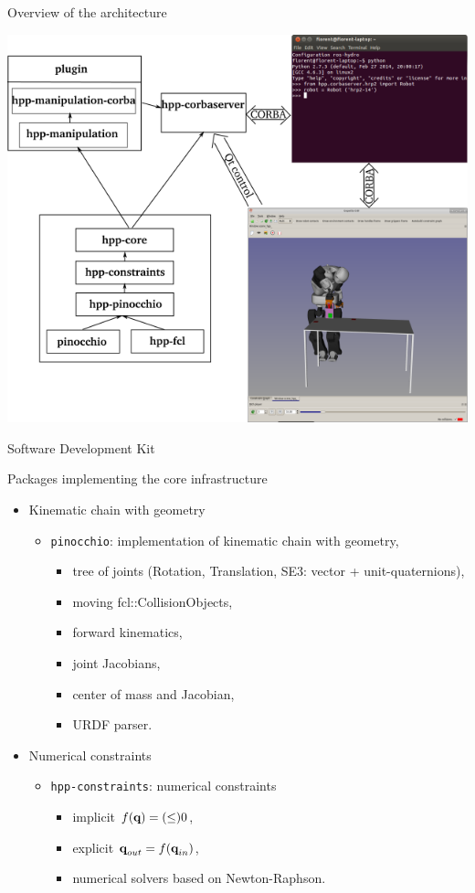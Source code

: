 %
%

\begin {frame} {Overview of the architecture}
\parbox {\linewidth} {
  \centerline {
    \includegraphics[width=.6\linewidth]{figures/archi-hpp.png}
  }
}
\end {frame}

%
%

\begin {frame} {Software Development Kit}

Packages implementing the core infrastructure
\begin{itemize}
\item Kinematic chain with geometry
  \begin{itemize}
  \item \texttt{pinocchio}: implementation of kinematic chain with geometry,
    \begin{itemize}
      \item tree of joints (Rotation, Translation, SE3: vector + unit-quaternions),
      \item moving fcl::CollisionObjects,
      \item forward kinematics,
      \item joint Jacobians,
      \item center of mass and Jacobian,
      \item URDF parser.
    \end{itemize}
  \end{itemize}
  \pause
\item Numerical constraints
  \begin{itemize}
  \item \texttt{hpp-constraints}: numerical constraints
    \begin {itemize}
    \item implicit $f (\textbf{q}) = (\leq) 0$,
    \item explicit $\textbf{q}_{out} = f (\textbf{q}_{in})$,
    \item numerical solvers based on Newton-Raphson.
    \end{itemize}
  \end{itemize}
\end{itemize}
\end {frame}

